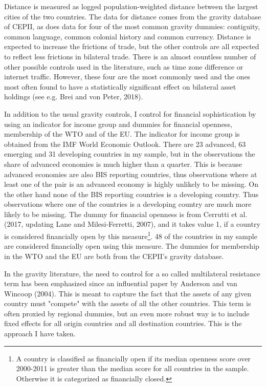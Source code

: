 \documentclass[12pt,a4paper]{article}
\begin{document}
Distance is measured as logged population-weighted distance between the largest cities of the two countries. The data for distance comes from the gravity database of CEPII, as does data for four of the most common gravity dummies: contiguity, common language, common colonial history and common currency. Distance is expected to increase the frictions of trade, but the other controls are all expected to reflect less frictions in bilateral trade. There is an almost countless number of other possible controls used in the literature, such as time zone difference or internet traffic. However, these four are the most commonly used and the ones most often found to have a statistically significant effect on bilateral asset holdings (see e.g. Brei and von Peter, 2018).

In addition to the usual gravity controls, I control for financial sophistication by using an indicator for income group and dummies for financial openness, membership of the WTO and of the EU. The indicator for income group is obtained from the IMF World Economic Outlook. There are 23 advanced, 63 emerging and 31 developing countries in my sample, but in the observations the share of advanced economies is much higher than a quarter. This is because advanced economies are also BIS reporting countries, thus observations where at least one of the pair is an advanced economy is highly unlikely to be missing. On the other hand none of the BIS reporting countries is a developing country. Thus observations where one of the countries is a developing country are much more likely to be missing. The dummy for financial openness is from Cerrutti et al. (2017, updating Lane and Milesi-Ferretti, 2007), and it takes value 1, if a country is considered financially open by this measure\footnote{A country is classified as financially open if its median openness score over 2000-2011 is greater than the median score for all countries in the sample. Otherwise it is categorized as financially closed.}. 48 of the countries in my sample are considered financially open using this measure. The dummies for membership in the WTO and the EU are both from the CEPII's gravity database. 

In the gravity literature, the need to control for a so called multilateral resistance term has been emphasized since an influential paper by Anderson and van Wincoop (2004). This is meant to capture the fact that the assets of any given country must "compete" with the assets of all the other countries. This term is often proxied by regional dummies, but an even more robust way is to include fixed effects for all origin countries and all destination countries. This is the approach I have taken. 
\end{document}
